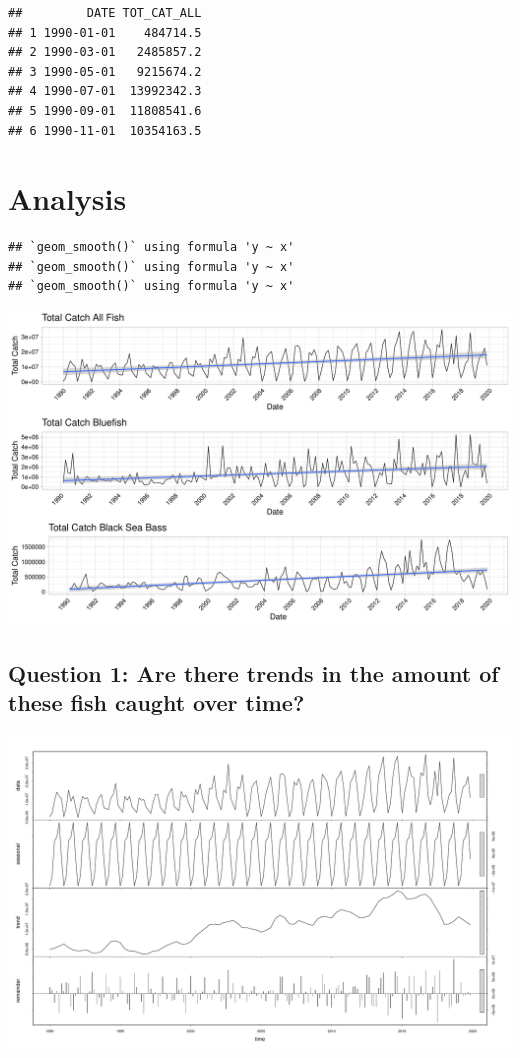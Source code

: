 \documentclass[
  12pt,
]{article}
\begin{document}
\begin{verbatim}
##         DATE TOT_CAT_ALL
## 1 1990-01-01    484714.5
## 2 1990-03-01   2485857.2
## 3 1990-05-01   9215674.2
## 4 1990-07-01  13992342.3
## 5 1990-09-01  11808541.6
## 6 1990-11-01  10354163.5
\end{verbatim}

\newpage

\hypertarget{analysis}{%
\section{Analysis}\label{analysis}}

\begin{verbatim}
## `geom_smooth()` using formula 'y ~ x'
## `geom_smooth()` using formula 'y ~ x'
## `geom_smooth()` using formula 'y ~ x'
\end{verbatim}

\includegraphics{Report_FishTrends_files/figure-latex/ggplot-1.pdf}

\hypertarget{question-1-are-there-trends-in-the-amount-of-these-fish-caught-over-time}{%
\subsection{Question 1: Are there trends in the amount of these fish
caught over
time?}\label{question-1-are-there-trends-in-the-amount-of-these-fish-caught-over-time}}

\includegraphics{Report_FishTrends_files/figure-latex/unnamed-chunk-3-1.pdf}
\end{document}
